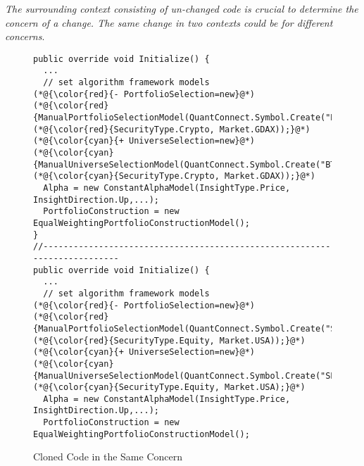  {\em The surrounding context
  consisting of un-changed code is crucial to determine the
  concern of a change. The same change in two 
  contexts could be for different concerns}.

\begin{figure}[t]
	\centering
	\begin{lstlisting}[]
public override void Initialize() {
  ...
  // set algorithm framework models
(*@{\color{red}{- PortfolioSelection=new}@*) (*@{\color{red}{ManualPortfolioSelectionModel(QuantConnect.Symbol.Create("BTCUSD",}@*) (*@{\color{red}{SecurityType.Crypto, Market.GDAX));}@*)   
(*@{\color{cyan}{+ UniverseSelection=new}@*) (*@{\color{cyan}{ManualUniverseSelectionModel(QuantConnect.Symbol.Create("BTCUSD",}@*) (*@{\color{cyan}{SecurityType.Crypto, Market.GDAX));}@*)
  Alpha = new ConstantAlphaModel(InsightType.Price, InsightDirection.Up,...);
  PortfolioConstruction = new EqualWeightingPortfolioConstructionModel();
}
//--------------------------------------------------------------------------
public override void Initialize() {
  ...
  // set algorithm framework models
(*@{\color{red}{- PortfolioSelection=new}@*) (*@{\color{red}{ManualPortfolioSelectionModel(QuantConnect.Symbol.Create("SPY",}@*) (*@{\color{red}{SecurityType.Equity, Market.USA));}@*)   
(*@{\color{cyan}{+ UniverseSelection=new}@*) (*@{\color{cyan}{ManualUniverseSelectionModel(QuantConnect.Symbol.Create("SPY",}@*) (*@{\color{cyan}{SecurityType.Equity, Market.USA);}@*)
  Alpha = new ConstantAlphaModel(InsightType.Price, InsightDirection.Up,...);
  PortfolioConstruction = new EqualWeightingPortfolioConstructionModel();
	\end{lstlisting}
        \vspace{-15pt}
        \caption{Cloned Code in the Same Concern}
        \vspace{-3pt}
        \label{fig:motiv-clone}
\end{figure}


